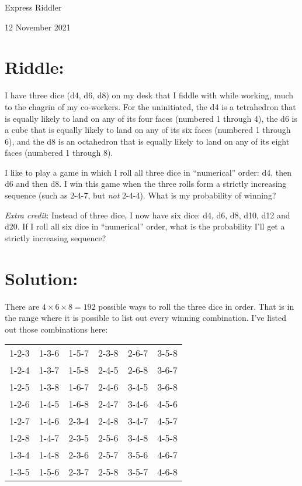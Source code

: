 \documentclass{article}
\begin{document}
\pagestyle{empty} %

\begin{center}
{\LARGE Express Riddler}

\vspace{0.15in}

{\Large 12 November 2021}
\end{center}


\section*{Riddle:}

I have three dice (d4, d6, d8) on my desk that I fiddle with while working, much to the chagrin of my co-workers.
For the uninitiated, the d4 is a tetrahedron that is equally likely to land on any of its four faces (numbered 1 through 4), the d6 is a cube that is equally likely to land on any of its six faces (numbered 1 through 6), and the d8 is an octahedron that is equally likely to land on any of its eight faces (numbered 1 through 8).

I like to play a game in which I roll all three dice in ``numerical'' order: d4, then d6 and then d8.
I win this game when the three rolls form a strictly increasing sequence (such as 2-4-7, but \textit{not} 2-4-4).
What is my probability of winning?

\textit{Extra credit}: Instead of three dice, I now have six dice: d4, d6, d8, d10, d12 and d20.
If I roll all six dice in ``numerical'' order, what is the probability I’ll get a strictly increasing sequence?


\section*{Solution:}

There are $4\times6\times8=192$ possible ways to roll the three dice in order.
That is in the range where it is possible to list out every winning combination.
I've listed out those combinations here:

\vspace{0.1in}
\begin{center}
\begin{tabular*}{3.5in}{@{\extracolsep{\fill}}cccccc}
1-2-3 & 1-3-6 & 1-5-7 & 2-3-8 & 2-6-7 & 3-5-8 \\
1-2-4 & 1-3-7 & 1-5-8 & 2-4-5 & 2-6-8 & 3-6-7 \\
1-2-5 & 1-3-8 & 1-6-7 & 2-4-6 & 3-4-5 & 3-6-8 \\
1-2-6 & 1-4-5 & 1-6-8 & 2-4-7 & 3-4-6 & 4-5-6 \\
1-2-7 & 1-4-6 & 2-3-4 & 2-4-8 & 3-4-7 & 4-5-7 \\
1-2-8 & 1-4-7 & 2-3-5 & 2-5-6 & 3-4-8 & 4-5-8 \\
1-3-4 & 1-4-8 & 2-3-6 & 2-5-7 & 3-5-6 & 4-6-7 \\
1-3-5 & 1-5-6 & 2-3-7 & 2-5-8 & 3-5-7 & 4-6-8 \\
\end{tabular*}
\end{center}
\vspace{0.1in}
\end{document}
